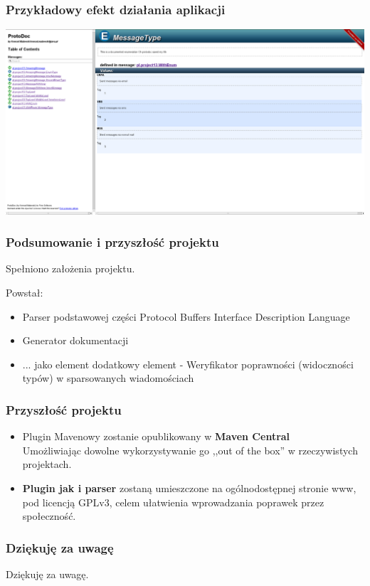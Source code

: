 \documentclass{beamer}
\begin{document}


\begin{frame}
\frametitle{Przykładowy efekt działania aplikacji}
\begin{center}
 \includegraphics[width = \textwidth]{protodoc_enum}
\end{center}
\end{frame}



\begin{frame}
\frametitle{Podsumowanie i przyszłość projektu}
Spełniono założenia projektu.

Powstał:
 \begin{itemize}
  \item Parser podstawowej części Protocol Buffers Interface Description Language
  \item Generator dokumentacji
  \item \small{... jako element dodatkowy element} - Weryfikator poprawności (widoczności typów) w sparsowanych wiadomościach
 \end{itemize}

\end{frame}



\begin{frame}
\frametitle{Przyszłość projektu}
\begin{itemize}
 \item Plugin Mavenowy zostanie opublikowany w \textbf{Maven Central} \\
       \small{Umożliwiając dowolne wykorzystywanie go ,,out of the box''} w rzeczywistych projektach.
 \item \textbf{Plugin jak i parser} zostaną umieszczone na ogólnodostępnej stronie www,
       pod licencją GPLv3, celem ułatwienia wprowadzania poprawek przez społeczność.
\end{itemize}

\end{frame}




\begin{frame}
\frametitle{Dziękuję za uwagę}

\begin{center}
 \LARGE{Dziękuję za uwagę.} 
\end{center}


\end{frame}
\end{document}

